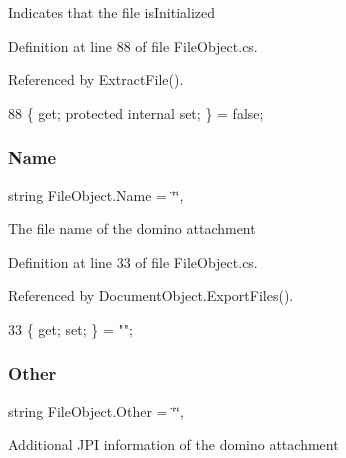 Indicates that the file is\+Initialized 



Definition at line 88 of file File\+Object.\+cs.



Referenced by Extract\+File().


\begin{DoxyCode}
88 \{ \textcolor{keyword}{get}; \textcolor{keyword}{protected} \textcolor{keyword}{internal} \textcolor{keyword}{set}; \} = \textcolor{keyword}{false};
\end{DoxyCode}
\mbox{\label{class_file_object_a9d47aff166393cb47490da2661576d62}} 
\subsubsection{\texorpdfstring{Name}{Name}}
{\footnotesize\ttfamily string File\+Object.\+Name = \char`\"{}\char`\"{}\hspace{0.3cm}{\ttfamily [get]}, {\ttfamily [set]}}



The file name of the domino attachment 



Definition at line 33 of file File\+Object.\+cs.



Referenced by Document\+Object.\+Export\+Files().


\begin{DoxyCode}
33 \{ \textcolor{keyword}{get}; \textcolor{keyword}{set}; \} = \textcolor{stringliteral}{""};
\end{DoxyCode}
\mbox{\label{class_file_object_ab91b5eca56a04784f8d0187247e1280c}} 
\subsubsection{\texorpdfstring{Other}{Other}}
{\footnotesize\ttfamily string File\+Object.\+Other = \char`\"{}\char`\"{}\hspace{0.3cm}{\ttfamily [get]}, {\ttfamily [set]}}



Additional J\+PI information of the domino attachment 



